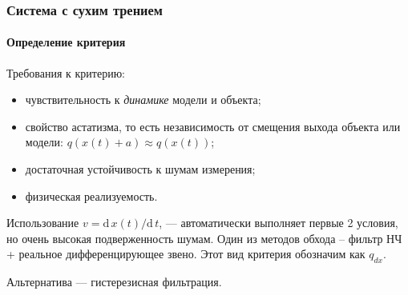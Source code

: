\documentclass[10pt,utf8]{beamer}
\begin{document}
\begin{frame}
  \frametitle{Система с сухим трением}
  \framesubtitle{Определение критерия}

  Требования к критерию:

  \begin{itemize}

    \item
      чувствительность к \textit{динамике} модели и объекта;

    \item
      свойство астатизма, то есть
      независимость
      от смещения выхода объекта или модели:
      \( q(x(t)+a ) \approx q( x(t) ) \);

    \item
      достаточная устойчивость к шумам измерения;

    \item
      физическая реализуемость.

  \end{itemize}

Использование
\(v = \mathrm{d}\,x(t)/ \mathrm{d}\,t \),
--- автоматически выполняет первые 2 условия, но очень высокая подверженность шумам.
Один из методов обхода -- фильтр НЧ + реальное дифференцирующее звено.
Этот вид критерия обозначим как $ q_{dx} $.

Альтернатива --- гистерезисная фильтрация.

\end{frame}


\end{document}
